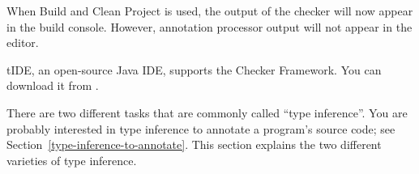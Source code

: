 \begin{enumerate}
When Build and Clean Project is used, the output of the checker will
now appear in the build console. However, annotation processor output
will not appear in the editor.

\end{enumerate}



\begin{sloppypar}
tIDE, an open-source Java IDE, supports the Checker Framework.
You can download it from .
\end{sloppypar}



There are two different tasks that are commonly called ``type inference''.
You are probably interested in type inference to annotate a program's
source code; see Section~\ref{type-inference-to-annotate}.  This section
explains the two different varieties of type inference.

